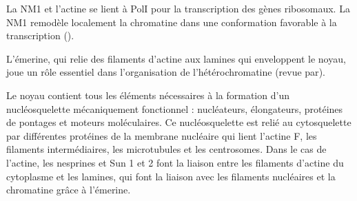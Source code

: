 La NM1 et l'actine se lient à PolI pour la transcription des gènes ribosomaux. La NM1 remodèle localement la chromatine dans une conformation favorable à la transcription (\cite{nowak_evidence_1997}).

L'émerine, qui relie des filaments d'actine aux lamines qui enveloppent le noyau, joue un rôle essentiel dans l'organisation de l'hétérochromatine (revue par\cite{gieni_actin_2009}). 


Le noyau contient tous les éléments nécessaires à la formation d'un nucléosquelette mécaniquement fonctionnel : nucléateurs, élongateurs, protéines de pontages et moteurs moléculaires. 
Ce nucléosquelette est relié au cytosquelette par différentes protéines de la membrane nucléaire qui lient l'actine F, les filaments intermédiaires, les microtubules et les centrosomes. 
Dans le cas de l'actine, les nesprines et Sun 1 et 2 font la liaison entre les filaments d'actine du cytoplasme et les lamines, qui font la liaison avec les filaments nucléaires et la chromatine grâce à l'émerine. 




%
%